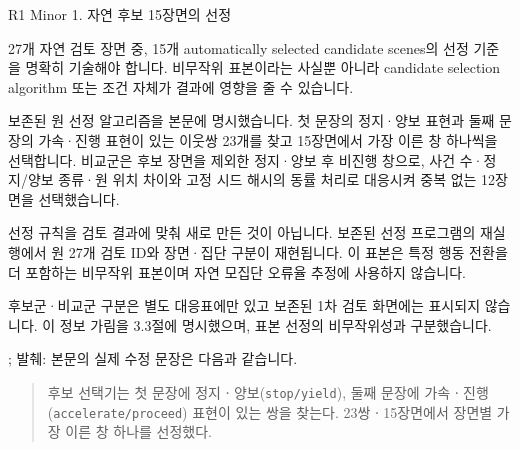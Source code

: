 \clearpage

\begin{reviewitem}{R1 Minor 1. 자연 후보 15장면의 선정}

\begin{reviewercomment}

27개 자연 검토 장면 중, 15개 automatically selected candidate scenes의 선정 기준을 명확히 기술해야 합니다. 비무작위 표본이라는 사실뿐 아니라 candidate selection algorithm 또는 조건 자체가 결과에 영향을 줄 수 있습니다.

\end{reviewercomment}

\begin{authorresponse}

보존된 원 선정 알고리즘을 본문에 명시했습니다. 첫 문장의 정지·양보 표현과 둘째 문장의 가속·진행 표현이 있는 이웃쌍 23개를 찾고 15장면에서 가장 이른 창 하나씩을 선택합니다. 비교군은 후보 장면을 제외한 정지·양보 후 비진행 창으로, 사건 수·정지/양보 종류·원 위치 차이와 고정 시드 해시의 동률 처리로 대응시켜 중복 없는 12장면을 선택했습니다.

선정 규칙을 검토 결과에 맞춰 새로 만든 것이 아닙니다. 보존된 선정 프로그램의 재실행에서 원 27개 검토 ID와 장면·집단 구분이 재현됩니다. 이 표본은 특정 행동 전환을 더 포함하는 비무작위 표본이며 자연 모집단 오류율 추정에 사용하지 않습니다.

후보군·비교군 구분은 별도 대응표에만 있고 보존된 1차 검토 화면에는 표시되지 않습니다. 이 정보 가림을 3.3절에 명시했으며, 표본 선정의 비무작위성과 구분했습니다.


\end{authorresponse}

\begin{manuscriptrevision}{; 발췌: }
본문의 실제 수정 문장은 다음과 같습니다.

\begin{quote}
후보 선택기는 첫 문장에 정지ㆍ양보(\texttt{stop/yield}), 둘째 문장에 가속ㆍ진행(\texttt{accelerate/proceed}) 표현이 있는 쌍을 찾는다. 23쌍ㆍ15장면에서 장면별 가장 이른 창 하나를 선정했다.
\end{quote}
\end{manuscriptrevision}

\end{reviewitem}

\clearpage

